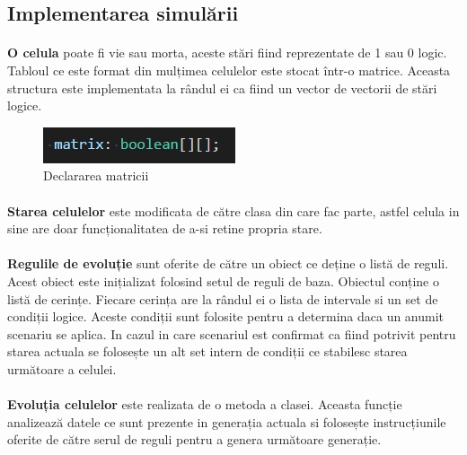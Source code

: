 \documentclass[11pt ,A4]{article}
\begin{document}
        \subsection{Implementarea simulării}
            \paragraph{}
                \textbf{O celula} poate fi vie sau morta, aceste stări fiind reprezentate de 1 sau 0 logic.
                Tabloul ce este format din mulțimea celulelor este stocat într-o matrice. Aceasta structura este implementata la rândul ei ca fiind un vector de vectorii de stări logice. 
                \begin{figure}[H]
                    \centering
                    \includegraphics[scale=0.8]{matrix_matrix_def}
                    \caption{Declararea matricii}
                \end{figure}

            \paragraph{}
                \textbf{Starea celulelor} este modificata de către clasa din care fac parte, astfel celula in sine are doar funcționalitatea de a-si retine propria stare.

            \paragraph{}
                \textbf{Regulile de evoluție} sunt oferite de către un obiect ce deține o listă de reguli.
                Acest obiect este inițializat folosind setul de reguli de baza. Obiectul conține o listă de cerințe.
                Fiecare cerința are la rândul ei o lista de intervale si un set de condiții logice.
                Aceste condiții sunt folosite pentru a determina daca un anumit scenariu se aplica.
                In cazul in care scenariul est confirmat ca fiind potrivit pentru starea actuala se folosește un alt set intern de condiții ce stabilesc starea următoare a celulei.
            
            \paragraph{}
                \textbf{Evoluția celulelor} este realizata de o metoda a clasei.
                Aceasta funcție analizează datele ce sunt prezente in generația actuala si folosește instrucțiunile oferite de către serul de reguli pentru a genera următoare generație.
\end{document}
